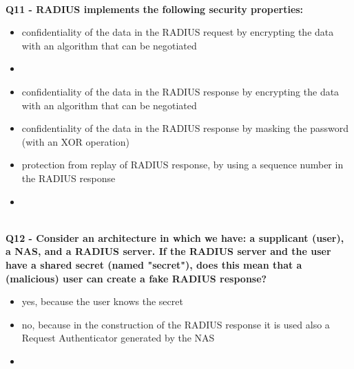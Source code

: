 \textbf{\\Q11 - RADIUS implements the following security properties:}
\begin{itemize}
	\item[A.] confidentiality of the data in the RADIUS request by encrypting the data with an algorithm that can be negotiated
	\item[B.] 
	\item[C.] confidentiality of the data in the RADIUS response by encrypting the data with an algorithm that can be negotiated
	\item[D.] confidentiality of the data in the RADIUS response by masking the password (with an XOR operation)
	\item[E.] protection from replay of RADIUS response, by using a sequence number in the RADIUS response
	\item[F.] 
\end{itemize}

\textbf{\\Q12 - Consider an architecture in which we have: a supplicant (user), a NAS, and a RADIUS server. If the  RADIUS server and the user have a shared secret (named "secret"), does this mean that a (malicious) user can create
	a fake RADIUS response?}
\begin{itemize}
	\item[A.] yes, because the user knows the secret
	\item[B.] no, because in the construction of the RADIUS response it is used also a Request Authenticator generated by the NAS
	\item[C.] 
\end{itemize}

